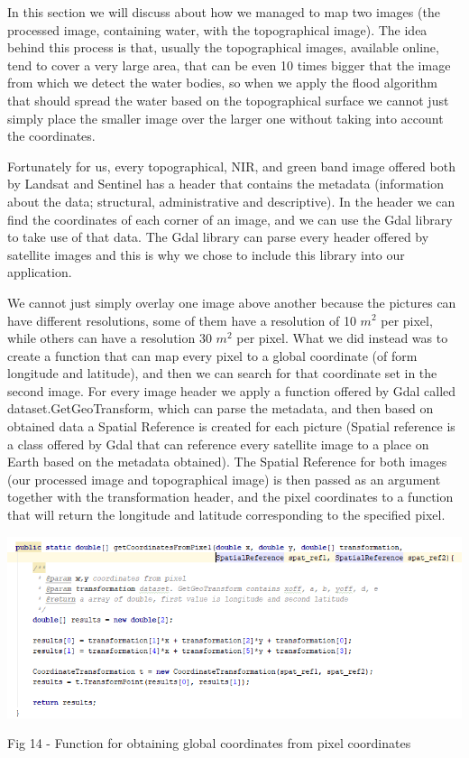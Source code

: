 \documentclass[12pt, a4paper]{report}
\begin{document}
\quad
In this section we will discuss about how we managed to map two images (the processed image, containing water, with the topographical image). The idea behind this process is that, usually the topographical images, available online, tend to cover a very large area, that can be even 10 times bigger that the image from which we detect the water bodies, so when we apply the flood algorithm that should spread the water based on the topographical surface we cannot just simply place the smaller image over the larger one without taking into account the coordinates. 
\par 

Fortunately for us, every topographical, NIR, and green band image offered both by Landsat and Sentinel has a header that contains the metadata (information about the data; structural, administrative and descriptive). In the header we can find the coordinates of each corner of an image, and we can use the Gdal library to take use of that data. The Gdal library can parse every header offered by satellite images and this is why we chose to include this library into our application. 
\par 

We cannot just simply overlay one image above another because the pictures can have different resolutions, some of them have a resolution of 10 $m^2$ per pixel, while others can have a resolution 30 $m^2$ per pixel. What we did instead was to create a function that can map every pixel to a global coordinate (of form longitude and latitude), and then we can search for that coordinate set in the second image. For every image header we apply a function offered by Gdal called dataset.GetGeoTransform, which can parse the metadata, and then based on obtained data a Spatial Reference is created for each picture (Spatial reference is a class offered by Gdal that can reference every satellite image to a place on Earth based on the metadata obtained). The Spatial Reference for both images (our processed image and topographical image) is then passed as an argument together with the transformation header, and the pixel coordinates to a function that will return the longitude and latitude corresponding to the specified pixel.

\bigskip
\includegraphics[scale=0.8, left]{java_coordinate_mapping.png}
\begin{center}
Fig 14 - Function for obtaining global coordinates from pixel coordinates
\end{center}
\par 
\end{document}
